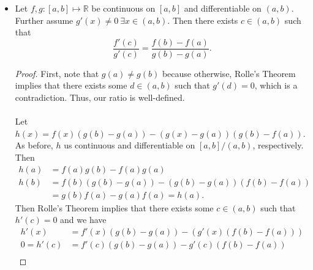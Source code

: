 \documentclass{article}
\newcommand{\R}{\mathbb{R}}
\newcommand{\?}{\stackrel{?}{=}}
\theoremstyle{definition} %
\begin{document}
\begin{itemize}
\begin{proof}
        \begin{align*}
            h(a) &= f(a) \cdot b - f(a) \cdot a \\
            h(b) &= f(b)(b - a) - (b - a)(f(b) - f(a)) \\
            &= (b - a) \cdot f(a) = h(a)
        \end{align*}
        Then Rolle's Theorem (\ref{thm:rolles}) implies that there exists a $c \in (a, b)$ such that $h'(c) = 0$ which means that
        \begin{align*}
            h'(x) &= f'(x)(b - a) - (f(b) - f(a)) \\
            0= h'(c) &= f'(c)(b - a) - (f(b) - f(a)) \\
            \iff f'(c) &= \frac{f(b) - f(a)}{b - a}.
        \end{align*}
    \end{proof}
    \item[]
    \begin{theorem}
        Let $f, g: [a, b] \mapsto \R$ be continuous on $[a, b]$ and differentiable on $(a, b)$. Further assume $g'(x) \neq 0 \ \exists x \in (a, b)$. Then there exists $c \in (a, b)$ such that
        $$\frac{f'(c)}{g'(c)} = \frac{f(b) - f(a)}{g(b) - g(a)}.$$
        \label{thm:mvt_cauchy}
    \end{theorem}
    \begin{proof}
        First, note that $g(a) \neq g(b)$ because otherwise, Rolle's Theorem implies that there exists some $d \in (a, b)$ such that $g'(d) = 0$, which is a contradiction. Thus, our ratio is well-defined. \\\\
        Let $h(x) = f(x)(g(b) - g(a)) - (g(x) - g(a))(g(b) - f(a))$. As before, $h$ us continuous and differentiable on $[a, b]/(a, b)$, respectively. Then
        \begin{align*}
            h(a) &= f(a)g(b) - f(a)g(a) \\
            h(b) &= f(b)(g(b) - g(a)) - (g(b) - g(a))(f(b) - f(a)) \\
            &= g(b)f(a) - g(a)f(a) = h(a).
        \end{align*}
        Then Rolle's Theorem implies that there exists some $c \in (a, b)$ such that $h'(c) = 0$ and we have
        \begin{align*}
            h'(x) &= f'(x)(g(b) - g(a)) - (g'(x)(f(b) - f(a))) \\
            0 = h'(c) &= f'(c)(g(b) - g(a)) - g'(c)(f(b) - f(a)) \\

\end{align*}
\end{proof}
\end{itemize}
\end{document}
